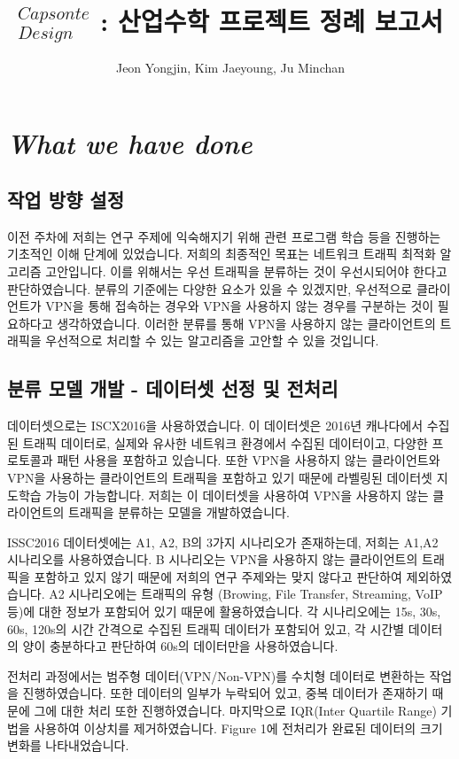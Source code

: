 \documentclass[14pt]{extarticle}
\author{Jeon Yongjin, Kim Jaeyoung, Ju Minchan}
\title{\(_{Design}^{Capsonte}\) : 산업수학 프로젝트 정례 보고서}
\begin{document}
\maketitle

\section{\textit{What we have done}}

\subsection{작업 방향 설정}

이전 주차에 저희는 연구 주제에 익숙해지기 위해 관련 프로그램 학습 등을 진행하는 기초적인 이해 단계에 있었습니다.
저희의 최종적인 목표는 네트워크 트래픽 최적화 알고리즘 고안입니다. 
이를 위해서는 우선 트래픽을 분류하는 것이 우선시되어야 한다고 판단하였습니다.
분류의 기준에는 다양한 요소가 있을 수 있겠지만, 
우선적으로 클라이언트가 VPN을 통해 접속하는 경우와 VPN을 사용하지 않는 경우를 구분하는 것이 필요하다고 생각하였습니다.
이러한 분류를 통해 VPN을 사용하지 않는 클라이언트의 트래픽을 우선적으로 처리할 수 있는 알고리즘을 고안할 수 있을 것입니다.

\subsection{분류 모델 개발 - 데이터셋 선정 및 전처리}
데이터셋으로는 ISCX2016을 사용하였습니다.
이 데이터셋은 2016년 캐나다에서 수집된 트래픽 데이터로,
실제와 유사한 네트워크 환경에서 수집된 데이터이고, 다양한 프로토콜과 패턴 사용을 포함하고 있습니다.
또한 VPN을 사용하지 않는 클라이언트와 VPN을 사용하는 클라이언트의 트래픽을 포함하고 있기 때문에 라벨링된 데이터셋 지도학습 가능이 가능합니다.
저희는 이 데이터셋을 사용하여 VPN을 사용하지 않는 클라이언트의 트래픽을 분류하는 모델을 개발하였습니다.

ISSC2016 데이터셋에는 A1, A2, B의 3가지 시나리오가 존재하는데, 저희는 A1,A2 시나리오를 사용하였습니다.
B 시나리오는 VPN을 사용하지 않는 클라이언트의 트래픽을 포함하고 있지 않기 때문에 저희의 연구 주제와는 맞지 않다고 판단하여 제외하였습니다.
A2 시나리오에는 트래픽의 유형 (Browing, File Transfer, Streaming, VoIP 등)에 대한 정보가 포함되어 있기 때문에 활용하였습니다.
각 시나리오에는 15s, 30s, 60s, 120s의 시간 간격으로 수집된 트래픽 데이터가 포함되어 있고, 각 시간별 데이터의 양이 충분하다고 판단하여 60s의 데이터만을 사용하였습니다.

전처리 과정에서는 범주형 데이터(VPN/Non-VPN)를 수치형 데이터로 변환하는 작업을 진행하였습니다.
또한 데이터의 일부가 누락되어 있고, 중복 데이터가 존재하기 때문에 그에 대한 처리 또한 진행하였습니다.
마지막으로 IQR(Inter Quartile Range) 기법을 사용하여 이상치를 제거하였습니다. Figure 1에 전처리가 완료된 데이터의 크기 변화를 나타내었습니다.
\end{document}
